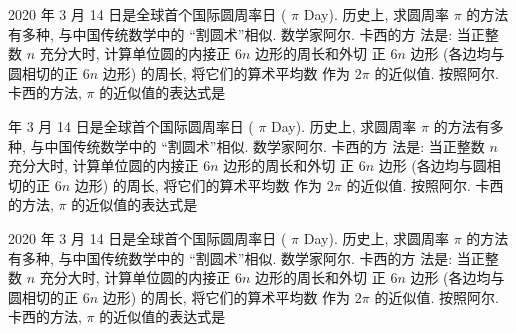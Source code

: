 \documentclass{ctexart}
\begin{document}
2020 年 3 月 14 日是全球首个国际圆周率日 ( $\pi$ Day). 历史上, 求圆周率 $\pi$ 的方法有多种, 与中国传统数学中的 “割圆术”相似. 数学家阿尔. 卡西的方 法是: 当正整数 $n$ 充分大时, 计算单位圆的内接正 $6 n$ 边形的周长和外切 正 $6 n$ 边形 (各边均与圆相切的正 $6 n$ 边形) 的周长, 将它们的算术平均数 作为 $2 \pi$ 的近似值. 按照阿尔. 卡西的方法, $\pi$ 的近似值的表达式是 \paren


 年 3 月 14 日是全球首个国际圆周率日 ( $\pi$ Day). 历史上, 求圆周率 $\pi$ 的方法有多种, 与中国传统数学中的 “割圆术”相似. 数学家阿尔. 卡西的方 法是: 当正整数 $n$ 充分大时, 计算单位圆的内接正 $6 n$ 边形的周长和外切 正 $6 n$ 边形 (各边均与圆相切的正 $6 n$ 边形) 的周长, 将它们的算术平均数 作为 $2 \pi$ 的近似值. 按照阿尔. 卡西的方法, $\pi$ 的近似值的表达式是 \paren
{}

2020 年 3 月 14 日是全球首个国际圆周率日 ( $\pi$ Day). 历史上, 求圆周率 $\pi$ 的方法有多种, 与中国传统数学中的 “割圆术”相似. 数学家阿尔. 卡西的方 法是: 当正整数 $n$ 充分大时, 计算单位圆的内接正 $6 n$ 边形的周长和外切 正 $6 n$ 边形 (各边均与圆相切的正 $6 n$ 边形) 的周长, 将它们的算术平均数 作为 $2 \pi$ 的近似值. 按照阿尔. 卡西的方法, $\pi$ 的近似值的表达式是 \paren
{}
\end{document}
